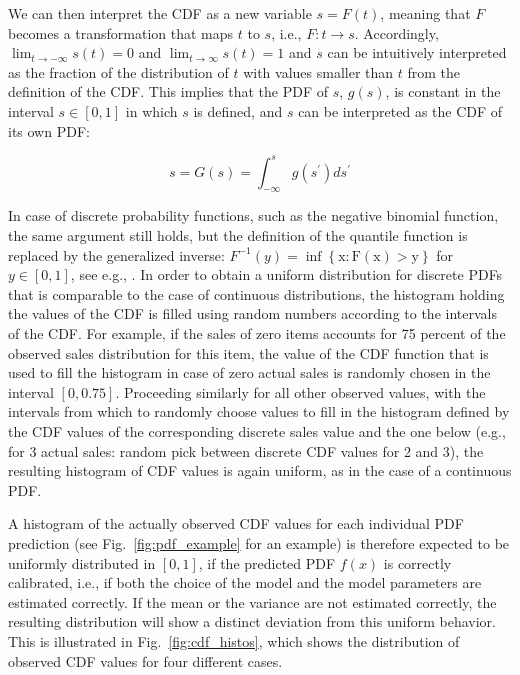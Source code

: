 \documentclass[BCOR=1mm, DIV=calc,10pt,
twoside=true,
twocolumn,
headings=normal]{scrartcl}
\newcommand{\fig}{Fig.~}
\begin{document}
We can then interpret the CDF as a new variable $s = F(t)$, meaning that $F$ becomes a transformation that maps $t$ to $s$, i.e., $F:t \to s$. Accordingly,  $\lim_{t \to -\infty}s(t) = 0$ and $\lim_{t \to \infty}s(t) = 1$ and $s$ can be intuitively interpreted as the fraction of the distribution of $t$ with values smaller than $t$ from the definition of the CDF. This implies that the PDF of $s$, $g(s)$, is constant in the interval $s \in [0,1]$ in which $s$ is defined, and $s$ can be interpreted as the CDF of its own PDF:

\begin{equation}
s = G(s) = \int_{-\infty}^{s} g(s^\prime) ds^\prime
\end{equation}

In case of discrete probability functions, such as the negative binomial function, the same argument still holds, but the definition of the quantile function is replaced by the generalized inverse: $F^{-1}(y) = \mathrm{\inf \left \{x : F(x)>y\right  \} }$ for $y \in [0,1]$, see e.g., \cite[p. 54]{casella2002statistical}. In order to obtain a uniform distribution for discrete PDFs that is comparable to the case of continuous distributions, the histogram holding the values of the CDF is filled using random numbers according to the intervals of the CDF. For example, if the sales of zero items accounts for 75 percent of the observed sales distribution for this item, the value of the CDF function that is used to fill the histogram in case of zero actual sales is randomly chosen in the interval $[0, 0.75]$. Proceeding similarly for all other observed values, with the intervals from which to randomly choose values to fill in the histogram defined by the CDF values of the corresponding discrete sales value and the one below (e.g., for 3 actual sales: random pick between discrete CDF values for 2 and 3), the resulting histogram of CDF values is again uniform, as in the case of a continuous PDF.

A histogram of the actually observed CDF values for each individual PDF prediction (see \fig \ref{fig:pdf_example} for an example) is therefore expected to be uniformly distributed in $[0,1]$, if the predicted PDF $f(x)$ is correctly calibrated, i.e., if both the choice of the model and the model parameters are estimated correctly. If the mean or the variance are not estimated correctly, the resulting distribution will show a distinct deviation from this uniform behavior. This is illustrated in \fig \ref{fig:cdf_histos}, which shows the distribution of observed CDF values for four different cases.
\end{document}

